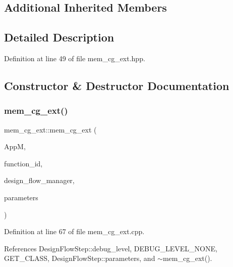 \subsection*{Additional Inherited Members}


\subsection{Detailed Description}


Definition at line 49 of file mem\+\_\+cg\+\_\+ext.\+hpp.



\subsection{Constructor \& Destructor Documentation}
\mbox{\label{classmem__cg__ext_ac600df8f688939e3794a3ea7dcac4151}} 
\subsubsection{\texorpdfstring{mem\+\_\+cg\+\_\+ext()}{mem\_cg\_ext()}}
{\footnotesize\ttfamily mem\+\_\+cg\+\_\+ext\+::mem\+\_\+cg\+\_\+ext (\begin{DoxyParamCaption}\item[{const \hyperlink{application__manager_8hpp_a04ccad4e5ee401e8934306672082c180}{application\+\_\+manager\+Ref}}]{AppM,  }\item[{const unsigned int}]{function\+\_\+id,  }\item[{const Design\+Flow\+Manager\+Const\+Ref}]{design\+\_\+flow\+\_\+manager,  }\item[{const \hyperlink{Parameter_8hpp_a37841774a6fcb479b597fdf8955eb4ea}{Parameter\+Const\+Ref}}]{parameters }\end{DoxyParamCaption})}



Definition at line 67 of file mem\+\_\+cg\+\_\+ext.\+cpp.



References Design\+Flow\+Step\+::debug\+\_\+level, D\+E\+B\+U\+G\+\_\+\+L\+E\+V\+E\+L\+\_\+\+N\+O\+NE, G\+E\+T\+\_\+\+C\+L\+A\+SS, Design\+Flow\+Step\+::parameters, and $\sim$mem\+\_\+cg\+\_\+ext().

